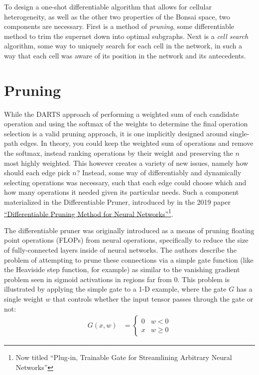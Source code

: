 To design a one-shot differentiable algorithm that allows for cellular heterogeneity, as well as the other
two properties of the Bonsai space, two components are necessary. First is a method of \textit{pruning},
some differentiable method to trim the supernet down into optimal subgraphs. Next is a \textit{cell search} algorithm,
some way to uniquely search for each cell in the network, in such a way that each cell was aware of
its position in the network and its antecedents.

\section{Pruning}\label{sect:pruner_introduction}
While the DARTS approach of performing a weighted sum of each candidate operation
and using the softmax of the weights to determine the final operation selection is a valid pruning approach, it is one
implicitly designed around single-path edges. In theory, you could keep the weighted sum of operations and remove the softmax,
instead ranking operations by their weight and preserving the $n$ most highly weighted. This however creates a variety of
new issues, namely how should each edge pick $n$? Instead, some way of differentiably and dynamically selecting
operations was necessary, such that each edge could choose which and how many operations it needed given its particular needs. Such a component
materialized in the Differentiable Pruner, introduced by \citeauthor{kim2019v2} in the 2019 paper
\hyperlink{cite.kim2019v2}{``Differentiable Pruning Method for Neural Networks''}\footnote{Now titled ``Plug-in,
	Trainable Gate for Streamlining Arbitrary Neural Networks''}.

The differentiable pruner was originally introduced as a means of pruning floating point operations (FLOPs) from neural operations, specifically to
reduce the size of fully-connected layers inside of neural networks. The authors describe the problem of attempting to
prune these connections via a simple gate function (like the Heaviside step function, for example) as similar to the
vanishing gradient problem seen in sigmoid activations in regions far from 0. This problem is illustrated by applying
the simple gate to a 1-D example, where the gate $G$ has a single weight $w$ that controls whether the input tensor passes
through the gate or not:
\begin{align}
	G(x, w) &= \begin{cases}
				0 & w<0 \\
				x & w\ge 0
	\end{cases}
\end{align}

